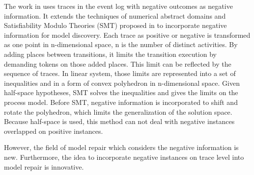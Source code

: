 The work in  \cite{ponce2016incorporating} uses traces in the event log with negative outcomes as negative information. It extends the techniques of numerical abstract domains and Satisfiability Modulo Theories (SMT) proposed in  \cite{carmona2014process} to incorporate negative information for model discovery. Each trace  as positive or negative is transformed as one point in n-dimensional space, n is the number of distinct activities. By adding places between transitions, it limits the transition execution by demanding tokens on those added places. This limit can be reflected by the sequence of traces.  In linear system, those limits are represented into a set of inequalities and in a form of convex polyhedron in n-dimensional space. Given half-space hypotheses, SMT solves the inequalities and gives the limits on the process model. Before SMT, negative information is incorporated to shift and rotate the polyhedron, which limits the generalization of the solution space. Because half-space is used, this method can not deal with negative instances overlapped on positive instances.


However, the field of model repair which considers the negative information is new. Furthermore, the idea to incorporate negative instances on trace level into model repair is innovative.  

\iffalse
Compared to this, our approach is innovative mainly in the following aspects. 
\begin{itemize}
	\item Incorporate the negative information into model repair. 
	\item Analyze the long-term dependency in the model to provide a preciser result. 
	\item Analyze Model on Trace level. All activities constituting a trace are considered. 
\end{itemize}
\fi